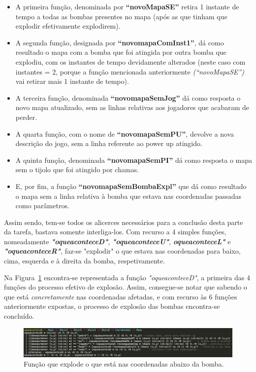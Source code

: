 \documentclass[a4paper]{article}
\begin{document}
\begin{itemize}
	\item A primeira função, denominada por {\large\textbf{“novoMapaSE”}} retira 1 instante de 
	tempo a todas as bombas presentes no mapa (após as que tinham que explodir efetivamente
	explodirem).
	\item A segunda função, designada por {\large\textbf{“novomapaComInst1”}}, dá como resultado o
	mapa com a bomba que foi atingida por outra bomba que explodiu, com os instantes de
	tempo devidamente alterados (neste caso com instantes = 2, porque a função mencionada 
	anteriormente \emph{(“novoMapaSE”)} vai retirar mais 1 instante de tempo).
	\item A terceira função, denominada {\large\textbf{“novomapaSemJog”}} dá como resposta o novo
	mapa atualizado, sem as linhas relativas aos jogadores que acabaram de perder.
	\item A quarta função, com o nome de {\large\textbf{“novomapaSemPU”}}, devolve a nova descrição
	do jogo, sem a linha referente ao power up atingido. 
	\item A quinta função, denominada {\large\textbf{“novomapaSemPI”}} dá como resposta o mapa sem 
	o tijolo que foi atingido por chamas.
	\item E, por fim, a função {\large\textbf{“novomapaSemBombaExpl”}} que dá como resultado o 
	mapa sem a linha relativa à bomba que estava nas coordenadas passadas como parâmetros.
\end{itemize}


Assim sendo, tem-se todos os alicerces necessários para a conclusão desta parte da tarefa, 
bastava somente interliga-los. Com recurso a 4 simples funções, nomeadamente \emph{\textbf{"oqueaconteceD"}},
\emph{\textbf{"oqueaconteceU"}}, \emph{\textbf{oqueaconteceL"}} e \emph{\textbf{"oqueaconteceR"}}, 
faz-se "explodir" o que estava nas coordenadas para baixo, cima, esquerda e à direita da bomba, respetivamente.

Na Figura~\ref{img:oqueaconteceD} encontra-se representada a função \emph{"oqueaconteceD"}, a primeira das 4 funções
do processo efetivo de explosão. Assim, consegue-se notar que sabendo o que está \emph{concretamente} nas 
coordenadas afetadas, e com recurso às 6 funções anteriormente expostas, o processo de explosão das bombas 
encontra-se concluído. 

\begin{figure}[H]
\centering 
\includegraphics[scale=0.40]{oqueaconteceD}
\caption{Função que explode o que está nas coordenadas abaixo da bomba.}
\label{img:oqueaconteceD}
\end{figure}
\end{document}
